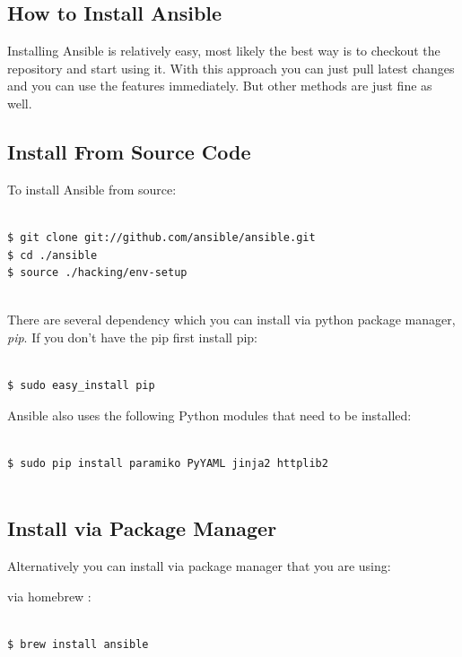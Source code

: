 \documentclass[10pt]{book}
\begin{document}
\begin{appendices}
\chapter{How to Install Ansible}
\label{appendix:How-to-install-ansible}
Installing Ansible is relatively easy, most likely the best way is to checkout the repository 
and start using it. With this approach you can just pull latest changes and you 
can use the features immediately. But other methods are just fine as well. 

\section{Install From Source Code}
 To install Ansible from source:
 
\begin{Verbatim}

$ git clone git://github.com/ansible/ansible.git
$ cd ./ansible
$ source ./hacking/env-setup
  
\end{Verbatim}

There are several dependency which you can install via python package manager, 
\emph{pip}. If you don't have the pip first install pip:

\begin{Verbatim}
  
$ sudo easy_install pip

\end{Verbatim}

Ansible also uses the following Python modules that need to be installed:

\begin{Verbatim}

$ sudo pip install paramiko PyYAML jinja2 httplib2
  
\end{Verbatim}

\section{Install via Package Manager}
Alternatively you can install via package manager that you are using:

via homebrew :

\begin{Verbatim}

$ brew install ansible

\end{Verbatim}


\end{appendices}
\end{document}

